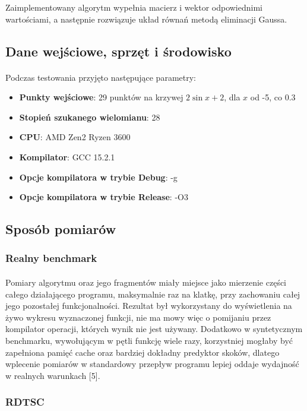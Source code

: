 \documentclass[12pt]{report}
\begin{document}
	Zaimplementowany algorytm wypełnia macierz i wektor odpowiednimi wartościami, a następnie rozwiązuje układ równań metodą eliminacji Gaussa.
	
	\subsection{Dane wejściowe, sprzęt i środowisko}
	\paragraph{}
	Podczas testowania przyjęto następujące parametry:
	\begin{itemize}
		\item \textbf{Punkty wejściowe}: 29 punktów na krzywej $2\sin x+2$, dla $x$ od -5, co 0.3
		\item \textbf{Stopień szukanego wielomianu}: 28
		\item \textbf{CPU}: AMD Zen2 Ryzen 3600
		\item \textbf{Kompilator}: GCC 15.2.1
		\item \textbf{Opcje kompilatora w trybie Debug}: -g
		\item \textbf{Opcje kompilatora w trybie Release}: -O3
	\end{itemize}
	
	\subsection{Sposób pomiarów}
	\subsubsection{Realny benchmark}
	\paragraph{}
	Pomiary algorytmu oraz jego fragmentów miały miejsce jako mierzenie części całego działającego programu, maksymalnie raz na klatkę, przy zachowaniu całej jego pozostałej funkcjonalności. Rezultat był wykorzystany do wyświetlenia na żywo wykresu wyznaczonej funkcji, nie ma mowy więc o pomijaniu przez kompilator operacji, których wynik nie jest używany. Dodatkowo w syntetycznym benchmarku, wywołującym w pętli funkcję wiele razy, korzystniej mogłaby być zapełniona pamięć cache oraz bardziej dokładny predyktor skoków, dlatego wplecenie pomiarów w standardowy przepływ programu lepiej oddaje wydajność w realnych warunkach [5].
	
	\subsubsection{RDTSC}
\end{document}
